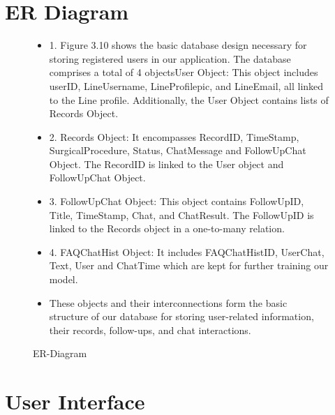 \documentclass[12pt,oneside,openright,a4paper]{cpe-english-project}
\begin{document}
  \section{ER Diagram}
    \begin{figure}[!h]
      \centering
      \caption{ER-Diagram}\label{fig:ER}
      \begin{itemize}
        \item[] 1. Figure 3.10 shows the basic database design necessary for storing registered users in our application. The database comprises a total of 4 objectsUser Object: This object includes userID, LineUsername, LineProfilepic, and LineEmail, all linked to the Line profile. Additionally, the User Object contains lists of Records Object.
        \item[] 2. Records Object: It encompasses RecordID, TimeStamp, SurgicalProcedure, Status, ChatMessage and FollowUpChat Object. The RecordID is linked to the User object and FollowUpChat Object.
        \item[] 3. FollowUpChat Object: This object contains FollowUpID, Title, TimeStamp, Chat, and ChatResult. The FollowUpID is linked to the Records object in a one-to-many relation.
        \item[] 4. FAQChatHist Object: It includes FAQChatHistID, UserChat, Text, User and ChatTime which are kept for further training our model.
        \item[] These objects and their interconnections form the basic structure of our database for storing user-related information, their records, follow-ups, and chat interactions.
      \end{itemize}
    \end{figure}
  \section{User Interface}
\end{document}
